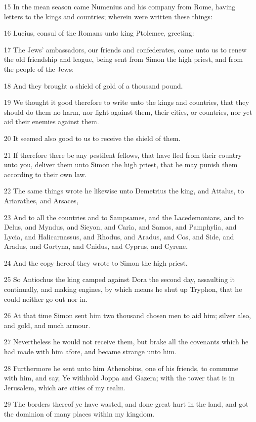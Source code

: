 \par 15 In the mean season came Numenius and his company from Rome, having letters to the kings and countries; wherein were written these things:
\par 16 Lucius, consul of the Romans unto king Ptolemee, greeting:
\par 17 The Jews' ambassadors, our friends and confederates, came unto us to renew the old friendship and league, being sent from Simon the high priest, and from the people of the Jews:
\par 18 And they brought a shield of gold of a thousand pound.
\par 19 We thought it good therefore to write unto the kings and countries, that they should do them no harm, nor fight against them, their cities, or countries, nor yet aid their enemies against them.
\par 20 It seemed also good to us to receive the shield of them.
\par 21 If therefore there be any pestilent fellows, that have fled from their country unto you, deliver them unto Simon the high priest, that he may punish them according to their own law.
\par 22 The same things wrote he likewise unto Demetrius the king, and Attalus, to Ariarathes, and Arsaces,
\par 23 And to all the countries and to Sampsames, and the Lacedemonians, and to Delus, and Myndus, and Sicyon, and Caria, and Samos, and Pamphylia, and Lycia, and Halicarnassus, and Rhodus, and Aradus, and Cos, and Side, and Aradus, and Gortyna, and Cnidus, and Cyprus, and Cyrene.
\par 24 And the copy hereof they wrote to Simon the high priest.
\par 25 So Antiochus the king camped against Dora the second day, assaulting it continually, and making engines, by which means he shut up Tryphon, that he could neither go out nor in.
\par 26 At that time Simon sent him two thousand chosen men to aid him; silver also, and gold, and much armour.
\par 27 Nevertheless he would not receive them, but brake all the covenants which he had made with him afore, and became strange unto him.
\par 28 Furthermore he sent unto him Athenobius, one of his friends, to commune with him, and say, Ye withhold Joppa and Gazera; with the tower that is in Jerusalem, which are cities of my realm.
\par 29 The borders thereof ye have wasted, and done great hurt in the land, and got the dominion of many places within my kingdom.

